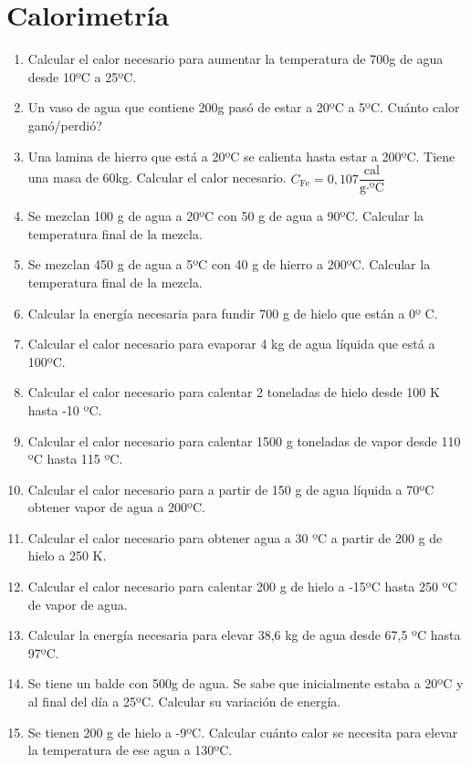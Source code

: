 \section{Calorimetría}

\begin{enumerate}
\item Calcular el calor necesario para aumentar la temperatura de 700g de agua desde 10ºC a 25ºC.

\item Un vaso de agua que contiene 200g pasó de estar a 20ºC a 5ºC. Cuánto calor ganó/perdió?

\item Una lamina de hierro que está a 20ºC se calienta hasta estar a 200ºC. Tiene una masa de 60kg. Calcular el calor necesario. $C_{\text{Fe}}=0,107 \dfrac{\text{cal}}{\text{g} \cdot \text{ºC}}$

\item Se mezclan 100 g de agua a 20ºC con 50 g de agua a 90ºC. Calcular la temperatura final de la mezcla.

\item Se mezclan 450 g de agua a 5ºC con 40 g de hierro a 200ºC. Calcular la temperatura final de la mezcla.

\item Calcular la energía necesaria para fundir 700 g de hielo que están a 0º C.

\item Calcular el calor necesario para evaporar 4 kg de agua líquida que está a 100ºC.

\item Calcular el calor necesario para calentar 2 toneladas de hielo desde 100 K hasta -10 ºC.

\item Calcular el calor necesario para calentar 1500 g toneladas de vapor desde 110 ºC hasta 115 ºC.

\item Calcular el calor necesario para a partir de 150 g de agua líquida a 70ºC obtener vapor de agua a 200ºC.

\item Calcular el calor necesario para obtener agua a 30 ºC a partir de 200 g de hielo a 250 K.

\item Calcular el calor necesario para calentar 200 g de hielo a -15ºC hasta 250 ºC de vapor de agua.

\item Calcular la energía necesaria para elevar 38,6 kg de agua desde 67,5 ºC hasta 97ºC.

\item Se tiene un balde con 500g de agua. Se sabe que inicialmente estaba a 20ºC y al final del día a 25ºC. Calcular su variación de energía.

\item Se tienen 200 g de hielo a -9ºC. Calcular cuánto calor se necesita para elevar la temperatura de ese agua a 130ºC.
\end{enumerate}


